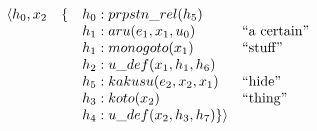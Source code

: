 \documentclass[a4paper,landscape,headrule,footrule,xetex]{foils}
\begin{document}
  \setlength{\arraycolsep}{0em}
\[\begin{array}[t]{llll}\setlength{\arraycolsep}{0em}
\langle  h_0,x_2 & \{& h_0:prpstn\_rel(h_5) \\
                  && h_1:aru(e_1,x_1,u_0) & \textnormal{``a certain''}\\
                  && h_1:monogoto(x_1) & \textnormal{``stuff''}\\ 
                  && h_2:u\_def(x_1,h_1,h_6) & \\
                  && h_5:kakusu(e_2,x_2,x_1) & \textnormal{``hide''}\\
                  && h_3:koto(x_2) & \textnormal{``thing''}\\
                  && h_4:u\_def(x_2,h_3,h_7) 
               \} \rangle
\end{array}\]

\end{document}
